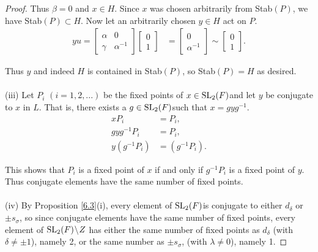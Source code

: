 \begin{proof}
Thus $\beta = 0$ and $x \in H$. Since $x$ was chosen arbitrarily from Stab$(P)$, we have Stab$(P) \subset H$. Now let an arbitrarily chosen $y \in H$ act on $P$. \\
\begin{align*} y u = \begin{bmatrix} \alpha & 0 \\ \gamma & \alpha^{-1} \end{bmatrix} \begin{bmatrix} 0 \\ 1 \end{bmatrix} &= \begin{bmatrix} 0 \\ \alpha^{-1} \end{bmatrix} \sim \begin{bmatrix} 0 \\ 1 \end{bmatrix}.
\end{align*}

Thus $y$ and indeed $H$ is contained in Stab$(P)$, so Stab$(P) = H$ as desired. \\
\\
(iii) Let $P_i$ $(i = 1,2,...)$ be the fixed points of $x\in \operatorname{SL}_2(F)$and let $y$ be conjugate to $x$ in $L$. That is, there exists a $g \in \operatorname{SL}_2(F)$such that $x = gyg^{-1}$.
\begin{align*} x P_i &= P_i,
\\ gyg^{-1} P_i &= P_i,
\\ y(g^{-1} P_i) &= (g^{-1} P_i).
\end{align*}

This shows that $P_i$ is a fixed point of $x$ if and only if $g^{-1} P_i$ is a fixed point of $y$. Thus conjugate elements have the same number of fixed points. \\
\\
(iv) By Proposition \ref{6.3}(i), every  element of $\operatorname{SL}_2(F)$is conjugate to either $d_\delta$ or $\pm s_\sigma$, so since conjugate elements have the same number of fixed points, every element of $\operatorname{SL}_2(F)\! \setminus \! Z$ has either the same number of fixed points as $d_\delta$ (with $\delta \neq \pm 1$), namely 2, or the same number as $\pm s_\sigma$, (with $\lambda \neq 0$), namely 1.

\end{proof}


